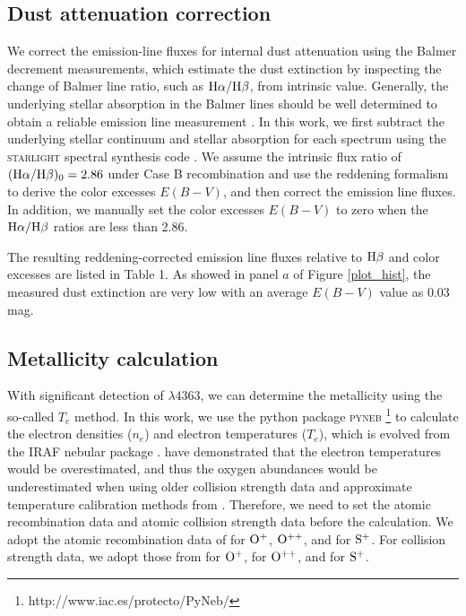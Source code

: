 \documentclass[usenatbib]{raa}
\begin{document}
\subsection{Dust attenuation correction}

We correct the emission-line fluxes for internal dust attenuation using the 
Balmer 
decrement measurements, which estimate the dust extinction by inspecting the 
change of Balmer
line ratio, such as $\hbox{H$\alpha$}/\hbox{H$\beta$}$, from intrinsic value.
Generally, the underlying stellar absorption in the Balmer lines should be well 
determined 
to obtain a reliable emission line measurement \citep{1674-4527-16-3-006}. 
 In this work, we first subtract the underlying stellar continuum 
and stellar absorption for each spectrum using the \textsc{starlight} spectral 
synthesis
code \citep{2005MNRAS.358..363C}. 
We assume the intrinsic flux ratio 
of $(\hbox{H$\alpha$}/\hbox{H$\beta$})_0=2.86$ \citep{1987MNRAS.224..801H}  under  Case B recombination 
and use the \cite{2000ApJ...533..682C}  reddening formalism to derive the color 
excesses
$E(B-V)$, and then  correct the emission line fluxes. In addition, we manually 
set the
color excesses $E(B-V)$ to zero when the $\hbox{H$\alpha$}/\hbox{H$\beta$}$ ratios are less than 2.86.
 
The resulting reddening-corrected emission line fluxes relative to $\hbox{H$\beta$}$ and 
color 
excesses are listed in Table 1. As showed in panel $a$ of Figure 
\ref{plot_hist}, 
the measured dust extinction are very low with an average $E(B-V)$ value as 
0.03 mag. 


\subsection{Metallicity calculation}

With significant detection of \oiii$\lambda4363$, we can determine the 
metallicity using 
the so-called $T_e$ method. 
In this work, we use the python package \textsc{pyneb}  
\footnote{http://www.iac.es/protecto/PyNeb/}
\citep{2015AA...573A..42L} to calculate the electron densities ($n_e$) 
and electron temperatures ($T_e$), which is evolved from the IRAF  nebular 
package
\citep{1995PASP..107..896S,1998ASPC..145..192S}.
\cite{2013ApJS..207...21N} have demonstrated that
the electron temperatures would be overestimated, and thus the oxygen
abundances would be underestimated when using older collision strength
data and approximate temperature calibration methods from  
\cite{2006AA...448..955I}.
  Therefore,
we need to set the atomic recombination data and atomic collision strength data 
before
the calculation. We adopt the atomic recombination data  of
\cite{2004ADNDT..87....1F} for $\rm O^+$, $\rm O^{++}$,  and
\cite{2010ApJS..188...32T} for $\rm S^+$. 
For collision strength data, we adopt those from 
\cite{2009MNRAS.397..903K} for $\rm O^+$,
\cite{2014MNRAS.441.3028S} for $\rm O^{++}$, and \cite{2010ApJS..188...32T} for 
$\rm S^+$.
 
\end{document}
